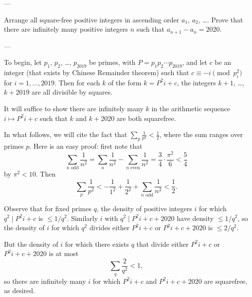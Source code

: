 
---

Arrange all square-free positive integers in ascending order $a_1$, $a_2$, \ldots. Prove that there are infinitely many positive integers $n$ such that $a_{n+1}-a_n=2020$.

---

To begin, let $p_1$, $p_2$, \ldots, $p_{2019}$ be primes, with $P=p_1p_2\cdots p_{2019}$, and let $c$ be an integer (that exists by Chinese Remainder theorem) such that $c\equiv -i\pmod{p_i^2}$ for $i=1,\ldots,2019$. Then for each $k$ of the form $k=P^2i+c$, the integers $k+1$, \ldots, $k+2019$ are all divisible by squares.

It will suffice to show there are infinitely many $k$ in the arithmetic sequence $i\mapsto P^2i+c$ such that $k$ and $k+2020$ are both squarefree.
\begin{remark}
    In what follows, we will cite the fact that $\sum_p\frac1{p^2}<\frac12$, where the sum ranges over primes $p$. Here is an easy proof: first note that
    \[\sum_{n\text{ odd}}\frac1{n^2}=\sum_n\frac1{n^2}-\sum_{n\text{ even}}\frac1{n^2}=\frac34\cdot\frac{\pi^2}6<\frac54\]
    by $\pi^2<10$. Then
    \[\sum_p\frac1{p^2}<-\frac1{1^2}+\frac1{2^2}+\sum_{n\text{ odd}}\frac1{n^2}<\frac12.\]
\end{remark}
Observe that for fixed primes $q$, the density of positive integers $i$ for which $q^2\mid P^2i+c$ is $\le1/q^2$. Similarly $i$ with $q^2\mid P^2i+c+2020$ have density $\le1/q^2$, so the density of $i$ for which $q^2$ divides either $P^2i+c$ or $P^2i+c+2020$ is $\le2/q^2$.

But the density of $i$ for which there exists $q$ that divide either $P^2i+c$ or $P^2i+c+2020$ is at most
\[\sum_q\frac2{q^2}<1,\]
so there are infinitely many $i$ for which $P^2i+c$ and $P^2i+c+2020$ are squarefree, as desired.

